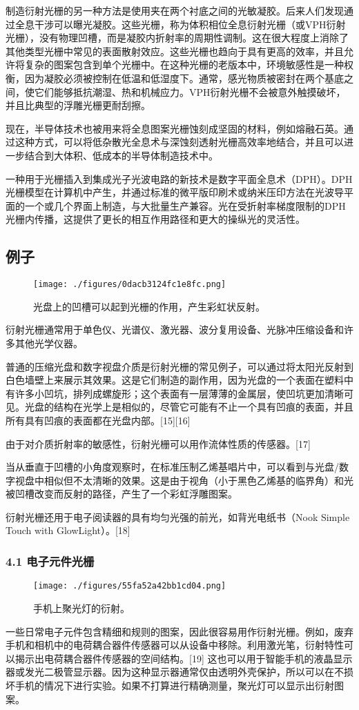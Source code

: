 制造衍射光栅的另一种方法是使用夹在两个衬底之间的光敏凝胶。后来人们发现通过全息干涉可以曝光凝胶。这些光栅，称为体积相位全息衍射光栅（或VPH衍射光栅），没有物理凹槽，而是凝胶内折射率的周期性调制。这在很大程度上消除了其他类型光栅中常见的表面散射效应。这些光栅也趋向于具有更高的效率，并且允许将复杂的图案包含到单个光栅中。在这种光栅的老版本中，环境敏感性是一种权衡，因为凝胶必须被控制在低温和低湿度下。通常，感光物质被密封在两个基底之间，使它们能够抵抗潮湿、热和机械应力。VPH衍射光栅不会被意外触摸破坏，并且比典型的浮雕光栅更耐刮擦。

现在，半导体技术也被用来将全息图案光栅蚀刻成坚固的材料，例如熔融石英。通过这种方式，可以将低杂散光全息术与深蚀刻透射光栅高效率地结合，并且可以进一步结合到大体积、低成本的半导体制造技术中。

一种用于光栅插入到集成光子光波电路的新技术是数字平面全息术（DPH）。DPH光栅模型在计算机中产生，并通过标准的微平版印刷术或纳米压印方法在光波导平面的一个或几个界面上制造，与大批量生产兼容。光在受折射率梯度限制的DPH光栅内传播，这提供了更长的相互作用路径和更大的操纵光的灵活性。

\subsection{例子}
\begin{figure}[ht]
\centering
\texttt{[image: ./figures/0dacb3124fc1e8fc.png]}
\caption{光盘上的凹槽可以起到光栅的作用，产生彩虹状反射。} \label{fig_YSGS_5}
\end{figure}
衍射光栅通常用于单色仪、光谱仪、激光器、波分复用设备、光脉冲压缩设备和许多其他光学仪器。

普通的压缩光盘和数字视盘介质是衍射光栅的常见例子，可以通过将太阳光反射到白色墙壁上来展示其效果。这是它们制造的副作用，因为光盘的一个表面在塑料中有许多小凹坑，排列成螺旋形；这个表面有一层薄薄的金属层，使凹坑更加清晰可见。光盘的结构在光学上是相似的，尽管它可能有不止一个具有凹痕的表面，并且所有具有凹痕的表面都在光盘内部。[15][16]

由于对介质折射率的敏感性，衍射光栅可以用作流体性质的传感器。[17]

当从垂直于凹槽的小角度观察时，在标准压制乙烯基唱片中，可以看到与光盘/数字视盘中相似但不太清晰的效果。这是由于视角（小于黑色乙烯基的临界角）和光被凹槽改变而反射的路径，产生了一个彩虹浮雕图案。

衍射光栅还用于电子阅读器的具有均匀光强的前光，如背光电纸书（Nook Simple Touch with GlowLight）。[18]

\subsubsection{4.1 电子元件光栅}
\begin{figure}[ht]
\centering
\texttt{[image: ./figures/55fa52a42bb1cd04.png]}
\caption{手机上聚光灯的衍射。} \label{fig_YSGS_6}
\end{figure}
一些日常电子元件包含精细和规则的图案，因此很容易用作衍射光栅。例如，废弃手机和相机中的电荷耦合器件传感器可以从设备中移除。利用激光笔，衍射特性可以揭示出电荷耦合器件传感器的空间结构。[19] 这也可以用于智能手机的液晶显示器或发光二极管显示器。因为这种显示器通常仅由透明外壳保护，所以可以在不损坏手机的情况下进行实验。如果不打算进行精确测量，聚光灯可以显示出衍射图案。

